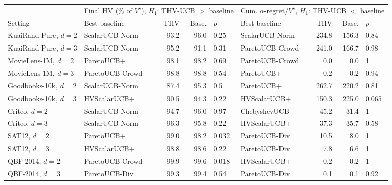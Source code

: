 \begin{tabular}{l lrrl lrrl}
\toprule
 & \multicolumn{4}{c}{Final HV (\% of $V^\star$), $H_1$: THV-UCB $>$ baseline} & \multicolumn{4}{c}{Cum. $\alpha$-regret$/V^\star$, $H_1$: THV-UCB $<$ baseline}\\
\cmidrule(lr){2-5}\cmidrule(lr){6-9}
Setting & Best baseline & THV & Base. & $p$ & Best baseline & THV & Base. & $p$\\
\midrule
KuaiRand-Pure, $d=2$ & ScalarUCB-Norm & 93.2 & 96.0 & 0.25 & ScalarUCB-Norm & 234.8 & 156.3 & 0.84\\
KuaiRand-Pure, $d=3$ & ScalarUCB-Norm & 95.2 & 91.1 & 0.31 & ParetoUCB-Crowd & 241.0 & 166.7 & 0.98\\
MovieLens-1M, $d=2$ & ParetoUCB+ & 98.1 & 98.2 & 0.69 & ParetoUCB-Crowd & 0.0 & 0.0 & 1\\
MovieLens-1M, $d=3$ & ParetoUCB-Crowd & 98.8 & 98.8 & 0.54 & ParetoUCB+ & 0.2 & 0.2 & 0.94\\
Goodbooks-10k, $d=2$ & ScalarUCB-Norm & 87.4 & 95.3 & 0.5 & ParetoUCB+ & 262.7 & 220.2 & 0.81\\
Goodbooks-10k, $d=3$ & HVScalarUCB+ & 90.5 & 94.3 & 0.22 & HVScalarUCB+ & 150.3 & 225.0 & 0.065\\
Criteo, $d=2$ & ScalarUCB-Norm & 94.7 & 96.0 & 0.97 & ChebyshevUCB+ & 45.2 & 31.4 & 1\\
Criteo, $d=3$ & ScalarUCB-Norm & 96.3 & 95.8 & 0.22 & HVScalarUCB+ & 37.3 & 35.7 & 0.58\\
SAT12, $d=2$ & ParetoUCB+ & 99.0 & 98.2 & 0.032 & ParetoUCB-Div & 10.5 & 8.0 & 1\\
SAT12, $d=3$ & HVScalarUCB+ & 98.8 & 98.6 & 0.22 & ParetoUCB-Div & 7.8 & 6.6 & 1\\
QBF-2014, $d=2$ & ParetoUCB-Crowd & 99.9 & 99.6 & 0.018 & HVScalarUCB+ & 0.2 & 0.2 & 1\\
QBF-2014, $d=3$ & ParetoUCB-Div & 99.3 & 99.4 & 0.54 & ParetoUCB-Div & 0.1 & 0.1 & 0.92\\
\bottomrule
\end{tabular}
